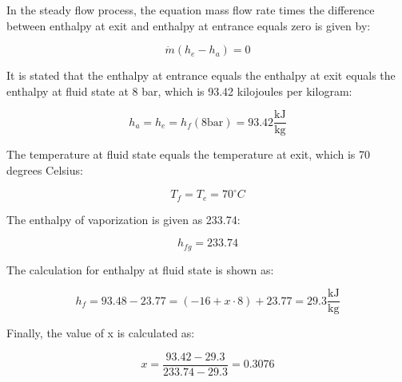 In the steady flow process, the equation mass flow rate times the difference between enthalpy at exit and enthalpy at entrance equals zero is given by:

\[ \dot{m} (h_e - h_a) = 0 \]

It is stated that the enthalpy at entrance equals the enthalpy at exit equals the enthalpy at fluid state at 8 bar, which is 93.42 kilojoules per kilogram:

\[ h_a = h_e = h_f (8 \text{bar}) = 93.42 \frac{\text{kJ}}{\text{kg}} \]

The temperature at fluid state equals the temperature at exit, which is 70 degrees Celsius:

\[ T_f = T_e = 70^\circ C \]

The enthalpy of vaporization is given as 233.74:

\[ h_{fg} = 233.74 \]

The calculation for enthalpy at fluid state is shown as:

\[ h_f = 93.48 - 23.77 = (-16 + x \cdot 8) + 23.77 = 29.3 \frac{\text{kJ}}{\text{kg}} \]

Finally, the value of x is calculated as:

\[ x = \frac{93.42 - 29.3}{233.74 - 29.3} = 0.3076 \]